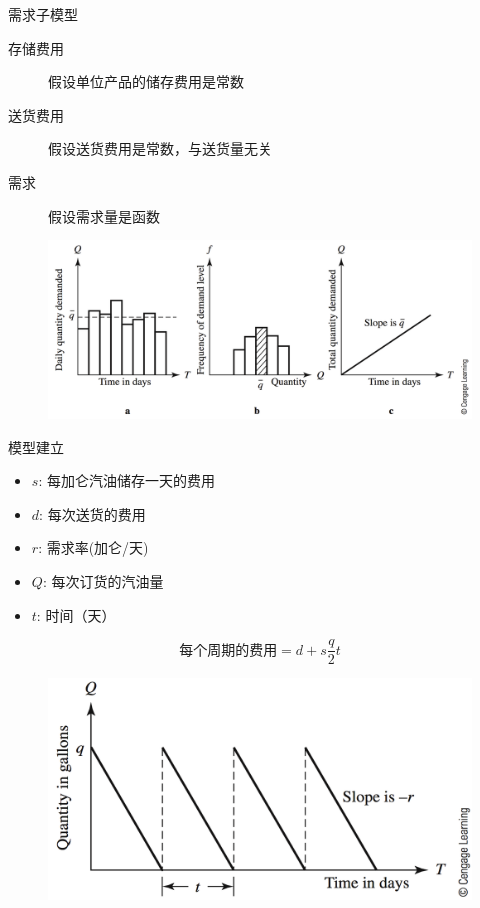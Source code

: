 \documentclass[mathserif, table]{beamer}
\begin{document}
\begin{frame}{需求子模型}

  \begin{description}
  \item[存储费用] 假设单位产品的储存费用是常数
  \item[送货费用] 假设送货费用是常数，与送货量无关
  \item[需求] 假设需求量是函数
  \end{description}

  \begin{figure}
    \centering
    \includegraphics[width=.8\textwidth{}]{13_2.png}
  \end{figure}
  
\end{frame}

\begin{frame}{模型建立}

  \begin{itemize}
  \item $s$: 每加仑汽油储存一天的费用
  \item $d$: 每次送货的费用
  \item $r$: 需求率(加仑/天)
  \item $Q$: 每次订货的汽油量
  \item $t$: 时间（天）
  \end{itemize}

  \[
    \text{每个周期的费用} = d + s\frac{q}{2}t
  \]

  \begin{figure}
    \centering
    \includegraphics[width=.5\textwidth{}]{13_3.png}
  \end{figure}
  
\end{frame}
\end{document}
